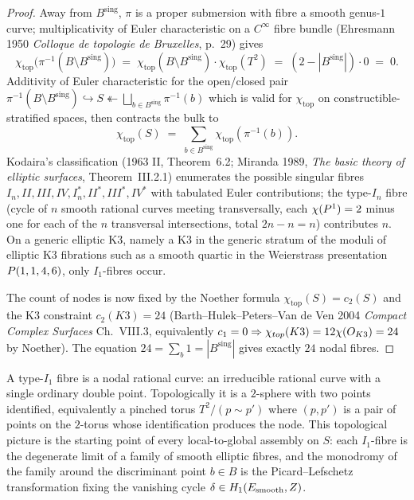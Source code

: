 \begin{proof}
Away from $B^{\mathrm{sing}}$, $\pi$ is a proper submersion with
fibre a smooth genus-$1$ curve; multiplicativity of Euler
characteristic on a $C^\infty$ fibre bundle
(Ehresmann 1950 \emph{Colloque de topologie de Bruxelles}, p.\ 29)
gives
\[
 \chi_{\mathrm{top}}\!\bigl(\pi^{-1}(B \setminus B^{\mathrm{sing}})\bigr)
 \;=\; \chi_{\mathrm{top}}(B \setminus B^{\mathrm{sing}}) \cdot
 \chi_{\mathrm{top}}(T^2) \;=\; (2 - |B^{\mathrm{sing}}|) \cdot 0 \;=\; 0.
\]
Additivity of Euler characteristic for the open/closed pair
$\pi^{-1}(B \setminus B^{\mathrm{sing}}) \hookrightarrow S
\twoheadleftarrow \bigsqcup_{b \in B^{\mathrm{sing}}} \pi^{-1}(b)$
which is valid for $\chi_{\mathrm{top}}$ on constructible-stratified
spaces, then contracts the bulk to
\[
 \chi_{\mathrm{top}}(S) \;=\;
 \sum_{b \in B^{\mathrm{sing}}} \chi_{\mathrm{top}}(\pi^{-1}(b)).
\]
Kodaira's classification (1963 II, Theorem~6.2; Miranda 1989,
\emph{The basic theory of elliptic surfaces}, Theorem~III.2.1)
enumerates the possible singular fibres $I_n, II, III, IV, I_n^*,
II^*, III^*, IV^*$ with tabulated Euler contributions; the
type-$I_n$ fibre (cycle of $n$ smooth rational curves meeting
transversally, each $\chi(P^1) = 2$ minus one for each of the $n$
transversal intersections, total $2n - n = n$) contributes $n$.
On a generic elliptic K3, namely a K3 in the generic stratum of the
moduli of elliptic K3 fibrations such as a smooth quartic in the
Weierstrass presentation $P(1, 1, 4, 6)$, only $I_1$-fibres occur.

The count of nodes is now fixed by the Noether formula
$\chi_{\mathrm{top}}(S) = c_2(S)$ and the K3 constraint $c_2(K3) =
24$ (Barth--Hulek--Peters--Van de Ven 2004 \emph{Compact Complex
Surfaces} Ch.~VIII.3, equivalently $c_1 = 0 \Rightarrow
\chi_{top}(K3) = 12 \chi(O_{K3}) = 24$ by
Noether). The equation $24 = \sum_b 1 = |B^{\mathrm{sing}}|$
gives exactly $24$ nodal fibres.
\end{proof}

\begin{remark}
\label{gluing:rem:I1-pinched-torus}
A type-$I_1$ fibre is a nodal rational curve: an irreducible rational
curve with a single ordinary double point. Topologically it is a
$2$-sphere with two points identified, equivalently a pinched torus
$T^2 / (p \sim p')$ where $(p, p')$ is a pair of points on the
$2$-torus whose identification produces the node. This topological
picture is the starting point of every local-to-global assembly on
$S$: each $I_1$-fibre is the degenerate limit of a family of smooth
elliptic fibres, and the monodromy of the family around the
discriminant point $b \in B$ is the Picard--Lefschetz transformation
fixing the vanishing cycle $\delta \in H_1(E_{\text{smooth}}, Z)$.
\end{remark}

